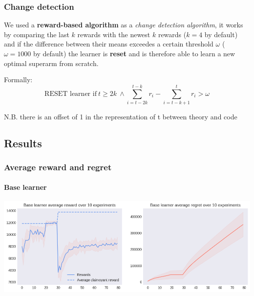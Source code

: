 
\begin{frame}
\frametitle{Change detection}

We used a \textbf{reward-based algorithm} as a \textit{change detection algorithm}, it works by comparing the last $k$ rewards with the newest $k$ rewards ($k=4$ by default) and if the difference between their means exceedes a certain threshold $\omega$ ($\omega=1000$ by default) the learner is \textbf{reset} and is therefore able to learn a new optimal superarm from scratch.

Formally:
\begin{displaymath}
    \text{RESET learner if} ~ t \geq 2k ~ \land \sum_{i=t-2k}^{t-k} r_i -\sum_{i=t-k+1}^t r_i > \omega
\end{displaymath}

\scriptsize N.B. there is an offset of 1 in the representation of t between theory and code

\end{frame}


\subsection{Results}


\begin{frame}[plain]

\frametitle{Average reward and regret}
\framesubtitle{Base learner}

\begin{center}
    \hspace*{-2.8em}
    \includegraphics[scale=0.5]{img/Graphs/non_stationary/image1.png}
\end{center}

\end{frame}

